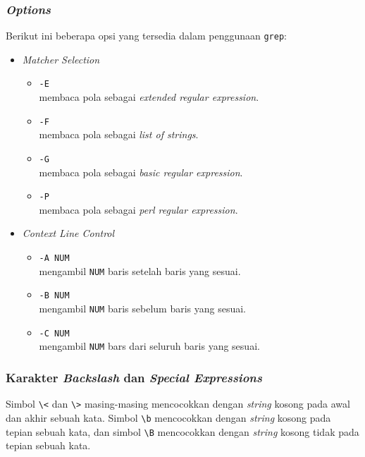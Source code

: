\subsubsection{\textit{Options}}
Berikut ini beberapa opsi yang tersedia dalam penggunaan \verb|grep|:
\begin{itemize}
    \item \textit{Matcher Selection} 
    \begin{itemize}
        \item \verb|-E| \\ membaca pola sebagai \textit{extended regular expression}.
        \item \verb|-F| \\ membaca pola sebagai \textit{list of strings}.
        \item \verb|-G| \\ membaca pola sebagai \textit{basic regular expression}.
        \item \verb|-P| \\ membaca pola sebagai \textit{perl regular expression}.
    \end{itemize}
    \item \textit{Context Line Control} 
    \begin{itemize}
        \item \verb|-A NUM| \\ mengambil \verb|NUM| baris setelah baris yang sesuai.
        \item \verb|-B NUM| \\ mengambil \verb|NUM| baris sebelum baris yang sesuai.
        \item \verb|-C NUM| \\ mengambil \verb|NUM| bars dari seluruh baris yang sesuai.
    \end{itemize}
\end{itemize}

\subsubsection{Karakter \textit{Backslash} dan \textit{Special Expressions}}
Simbol \verb|\<| dan \verb|\>| masing-masing mencocokkan dengan \textit{string} kosong pada awal dan akhir sebuah kata. Simbol \verb|\b| mencocokkan dengan \textit{string} kosong pada tepian sebuah kata, dan simbol \verb|\B| mencocokkan dengan \textit{string} kosong tidak pada tepian sebuah kata.

